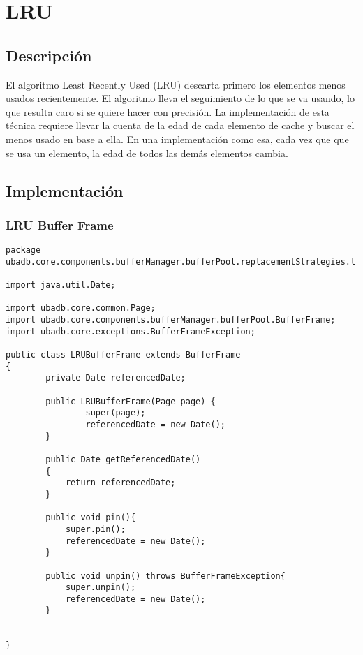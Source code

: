 \section{LRU}

\subsection{Descripción}

El algoritmo Least Recently Used (LRU) descarta primero los elementos menos usados recientemente. El algoritmo lleva el seguimiento de lo que se va usando, lo que resulta caro si se quiere hacer con precisión. La implementación de esta técnica requiere llevar la cuenta de la edad de cada elemento de cache y buscar el menos usado en base a ella. En una implementación como esa, cada vez que que se usa un elemento, la edad de todos las demás elementos cambia.

\subsection{Implementación}

\subsubsection{LRU Buffer Frame}

\begin{lstlisting}
package ubadb.core.components.bufferManager.bufferPool.replacementStrategies.lru;

import java.util.Date;

import ubadb.core.common.Page;
import ubadb.core.components.bufferManager.bufferPool.BufferFrame;
import ubadb.core.exceptions.BufferFrameException;

public class LRUBufferFrame extends BufferFrame 
{                
		private Date referencedDate;
	
        public LRUBufferFrame(Page page) {
                super(page);     
                referencedDate = new Date();
        }
        
        public Date getReferencedDate()
    	{
    		return referencedDate;
    	}
        
        public void pin(){
        	super.pin();
        	referencedDate = new Date();
        }
        
        public void unpin() throws BufferFrameException{
        	super.unpin();
        	referencedDate = new Date();
        }


}
\end{lstlisting}

